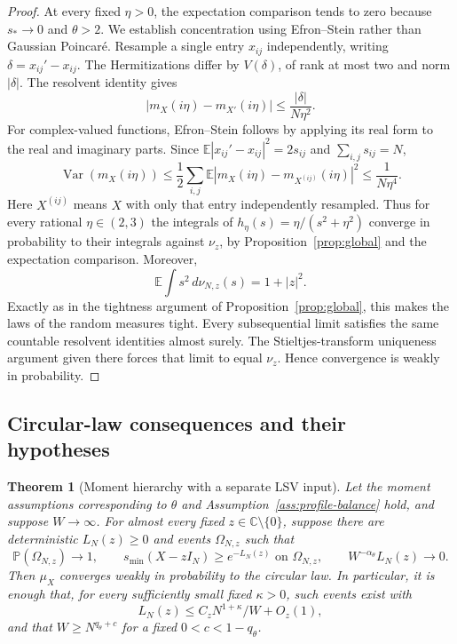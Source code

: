\documentclass[11pt,reqno]{amsart}
\numberwithin{equation}{section}
\theoremstyle{plain}
\newtheorem{theorem}{Theorem}[section]
\theoremstyle{definition}
\theoremstyle{remark}
\begin{document}
\begin{proof}
At every fixed $\eta>0$, the expectation comparison tends to zero because
$s_*\to0$ and $\theta>2$.  We establish concentration using
Efron--Stein rather than Gaussian Poincar\'e.  Resample a single entry
$x_{ij}$ independently, writing $\delta=x_{ij}'-x_{ij}$.  The
Hermitizations differ by $V(\delta)$, of rank at most two and norm
$|\delta|$.  The resolvent identity gives
\[
 |m_X(i\eta)-m_{X'}(i\eta)|
 \le\frac{|\delta|}{N\eta^2}.
\]
For complex-valued functions, Efron--Stein follows by applying its real
form to the real and imaginary parts.  Since
$\mathbb E|x_{ij}'-x_{ij}|^2=2s_{ij}$ and $\sum_{i,j}s_{ij}=N$,
\begin{equation}\label{eq:moment-efron-stein}
 \operatorname{Var}(m_X(i\eta))
 \le\frac12\sum_{i,j}\mathbb E
       |m_X(i\eta)-m_{X^{(ij)}}(i\eta)|^2
 \le\frac1{N\eta^4}.
\end{equation}
Here $X^{(ij)}$ means $X$ with only that entry independently resampled.
Thus for every rational $\eta\in(2,3)$ the integrals of
$h_\eta(s)=\eta/(s^2+\eta^2)$ converge in probability to their integrals
against $\nu_z$, by Proposition~\ref{prop:global} and the expectation
comparison.  Moreover,
\[
 \mathbb E\int s^2\,d\nu_{N,z}(s)=1+|z|^2.
\]
Exactly as in the tightness argument of Proposition~\ref{prop:global},
this makes the laws of the random measures tight.  Every subsequential
limit satisfies the same countable resolvent identities almost surely.
The Stieltjes-transform uniqueness argument given there forces that limit
to equal $\nu_z$.  Hence convergence is weakly in probability.
\end{proof}

\subsection{Circular-law consequences and their hypotheses}

\begin{theorem}[Moment hierarchy with a separate LSV input]
\label{thm:moment-circular}
Let the moment assumptions corresponding to $\theta$ and
Assumption~\ref{ass:profile-balance} hold, and suppose $W\to\infty$.
For almost every fixed $z\in\mathbb C\setminus\{0\}$, suppose there are
deterministic $L_N(z)\ge0$ and events $\Omega_{N,z}$ such that
\begin{equation}\label{eq:moment-LSV-hypothesis}
 \mathbb P(\Omega_{N,z})\to1,\qquad
 s_{\min}(X-zI_N)\ge e^{-L_N(z)}\text{ on }\Omega_{N,z},\qquad
 W^{-\alpha_\theta}L_N(z)\to0.
\end{equation}
Then $\mu_X$ converges weakly in probability to the circular law.
In particular, it is enough that, for every sufficiently small fixed
$\kappa>0$, such events exist with
\begin{equation}\label{eq:moment-LSV-power}
 L_N(z)\le C_zN^{1+\kappa}/W+O_z(1),
\end{equation}
and that $W\ge N^{q_\theta+c}$ for a fixed
$0<c<1-q_\theta$.
\end{theorem}
\end{document}
